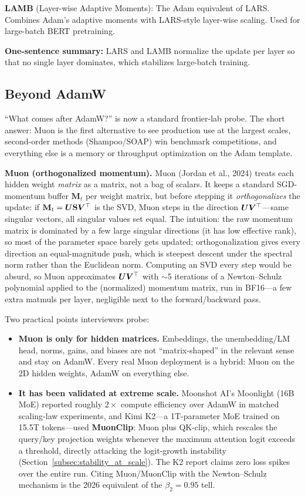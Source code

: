 \textbf{LAMB} (Layer-wise Adaptive Moments): The Adam equivalent of LARS. Combines Adam's adaptive moments with LARS-style layer-wise scaling. Used for large-batch BERT pretraining.

\textbf{One-sentence summary:} LARS and LAMB normalize the update per layer so that no single layer dominates, which stabilizes large-batch training.

\subsection{Beyond AdamW}
\label{subsec:beyond_adamw}

``What comes after AdamW?'' is now a standard frontier-lab probe. The short answer: Muon is the first alternative to see production use at the largest scales, second-order methods (Shampoo/SOAP) win benchmark competitions, and everything else is a memory or throughput optimization on the Adam template.

\textbf{Muon (orthogonalized momentum).} Muon (Jordan et al., 2024) treats each hidden weight \emph{matrix} as a matrix, not a bag of scalars. It keeps a standard SGD-momentum buffer $\mathbf{M}_t$ per weight matrix, but before stepping it \emph{orthogonalizes} the update: if $\mathbf{M}_t = \bm{U} \mathbf{S} \bm{V}^\top$ is the SVD, Muon steps in the direction $\bm{U}\bm{V}^\top$---same singular vectors, all singular values set equal. The intuition: the raw momentum matrix is dominated by a few large singular directions (it has low effective rank), so most of the parameter space barely gets updated; orthogonalization gives every direction an equal-magnitude push, which is steepest descent under the spectral norm rather than the Euclidean norm. Computing an SVD every step would be absurd, so Muon approximates $\bm{U}\bm{V}^\top$ with $\sim$5 iterations of a Newton--Schulz polynomial applied to the (normalized) momentum matrix, run in BF16---a few extra matmuls per layer, negligible next to the forward/backward pass.

Two practical points interviewers probe:
\begin{itemize}
    \item \textbf{Muon is only for hidden matrices.} Embeddings, the unembedding/LM head, norms, gains, and biases are not ``matrix-shaped'' in the relevant sense and stay on AdamW. Every real Muon deployment is a hybrid: Muon on the 2D hidden weights, AdamW on everything else.
    \item \textbf{It has been validated at extreme scale.} Moonshot AI's Moonlight (16B MoE) reported roughly $2\times$ compute efficiency over AdamW in matched scaling-law experiments, and Kimi K2---a 1T-parameter MoE trained on 15.5T tokens---used \textbf{MuonClip}: Muon plus QK-clip, which rescales the query/key projection weights whenever the maximum attention logit exceeds a threshold, directly attacking the logit-growth instability (Section~\ref{subsec:stability_at_scale}). The K2 report claims zero loss spikes over the entire run. Citing Muon/MuonClip with the Newton--Schulz mechanism is the 2026 equivalent of the $\beta_2 = 0.95$ tell.
\end{itemize}

